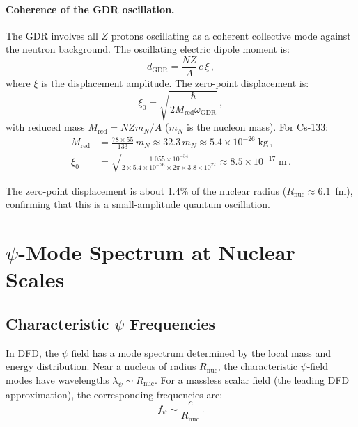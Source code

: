 \documentclass[aps,prd,twocolumn,superscriptaddress,nofootinbib]{revtex4-2}
\newcommand{\ee}[1]{\times 10^{#1}}
\newcommand{\wGDR}{\omega_{\mathrm{GDR}}}
\newcommand{\Rnuc}{R_{\mathrm{nuc}}}
\newcommand{\fpsi}{f_\psi}
\begin{document}
\paragraph{Coherence of the GDR oscillation.}
The GDR involves all $Z$ protons oscillating as a coherent
collective mode against the neutron background.  The oscillating
electric dipole moment is:
\begin{equation}\label{eq:gdr-dipole}
d_{\mathrm{GDR}} = \frac{NZ}{A}\,e\,\xi\,,
\end{equation}
where $\xi$ is the displacement amplitude.  The zero-point
displacement is:
\begin{equation}\label{eq:gdr-xi}
\xi_0 = \sqrt{\frac{\hbar}{2M_{\mathrm{red}}\wGDR}}\,,
\end{equation}
with reduced mass $M_{\mathrm{red}} = NZm_N/A$ ($m_N$ is the nucleon
mass).  For Cs-133:
\begin{align}
M_{\mathrm{red}} &= \frac{78 \times 55}{133}\,m_N
\approx 32.3\,m_N \approx 5.4\ee{-26}\;\mathrm{kg}\,,\\
\xi_0 &= \sqrt{\frac{1.055\ee{-34}}{2 \times 5.4\ee{-26}
\times 2\pi \times 3.8\ee{22}}}
\approx 8.5\ee{-17}\;\mathrm{m}\,.
\end{align}

The zero-point displacement is about 1.4\% of the nuclear radius
($\Rnuc \approx 6.1$~fm), confirming that this is a small-amplitude
quantum oscillation.


\section{$\psi$-Mode Spectrum at Nuclear Scales}
\label{sec:psi-modes}

\subsection{Characteristic $\psi$ Frequencies}
\label{sec:psi-freq}

In DFD, the $\psi$ field has a mode spectrum determined by the local
mass and energy distribution.  Near a nucleus of radius $\Rnuc$, the
characteristic $\psi$-field modes have wavelengths $\lambda_\psi \sim
\Rnuc$.  For a massless scalar field (the leading DFD approximation),
the corresponding frequencies are:
\begin{equation}\label{eq:f-psi}
\fpsi \sim \frac{c}{\Rnuc}\,.
\end{equation}
\end{document}
